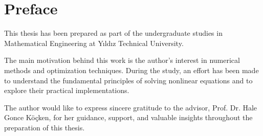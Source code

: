 \chapter*{Preface}

This thesis has been prepared as part of the undergraduate studies in Mathematical Engineering at Yıldız Technical University.

The main motivation behind this work is the author’s interest in numerical methods and optimization techniques. During the study, an effort has been made to understand the fundamental principles of solving nonlinear equations and to explore their practical implementations.

The author would like to express sincere gratitude to the advisor, Prof. Dr. Hale Gonce Köçken, for her guidance, support, and valuable insights throughout the preparation of this thesis.